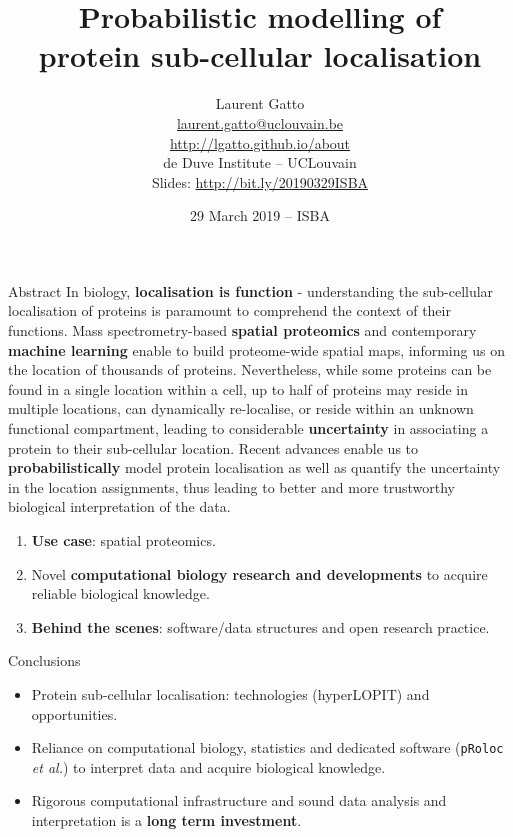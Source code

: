 \documentclass[presentation]{beamer}
\date{29 March 2019 -- ISBA}
\title{Probabilistic modelling of \\ protein sub-cellular localisation}
\author{Laurent Gatto\\
  \url{laurent.gatto@uclouvain.be}\\
  \url{http://lgatto.github.io/about}\\
  de Duve Institute -- UCLouvain\\  
  \bigskip
  Slides: \url{http://bit.ly/20190329ISBA}
}
\begin{document}
\maketitle


\begin{frame}{Abstract}
  In biology, \textbf{localisation is function} - understanding the
  sub-cellular localisation of proteins is paramount to comprehend the
  context of their functions. Mass spectrometry-based \textbf{spatial
    proteomics} and contemporary \textbf{machine learning} enable to
  build proteome-wide spatial maps, informing us on the location of
  thousands of proteins. Nevertheless, while some proteins can be
  found in a single location within a cell, up to half of proteins may
  reside in multiple locations, can dynamically re-localise, or reside
  within an unknown functional compartment, leading to considerable
  \textbf{uncertainty} in associating a protein to their sub-cellular
  location. Recent advances enable us to \textbf{probabilistically}
  model protein localisation as well as quantify the uncertainty in
  the location assignments, thus leading to better and more
  trustworthy biological interpretation of the data.
\end{frame}


\begin{frame}
  \begin{block}{}
  \begin{enumerate}
  \item \textbf{Use case}: spatial proteomics.
  \item Novel \textbf{computational biology research and developments}
    to acquire reliable biological knowledge.
  \item \textbf{Behind the scenes}: software/data structures and open research
    practice.
  \end{enumerate}
  \end{block}
\end{frame}







\begin{frame}[fragile]{Conclusions}
  \begin{itemize}
  \item Protein sub-cellular localisation: technologies (hyperLOPIT)
    and opportunities.

  \item Reliance on computational biology, statistics and dedicated
    software (\texttt{pRoloc} \textit{et al.}) to interpret data and
    acquire biological knowledge.

  \item Rigorous computational infrastructure and sound data analysis
    and interpretation is a \textbf{long term investment}.

  \end{itemize}

\end{frame}
\end{document}
